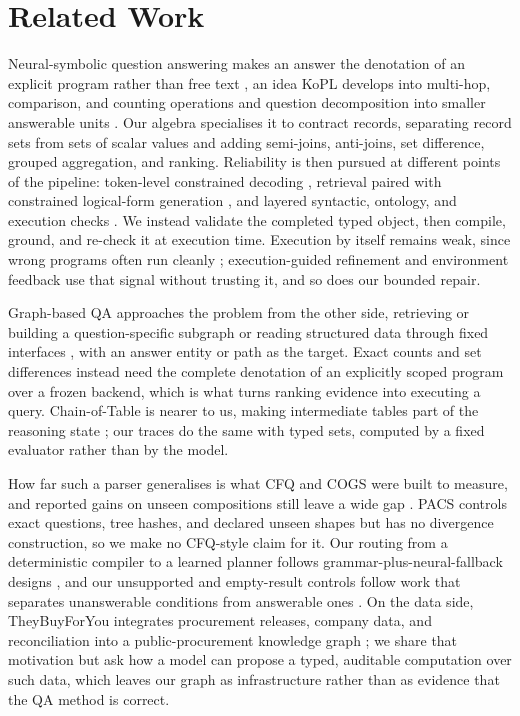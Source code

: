 \section{Related Work}
\label{sec:related}

Neural-symbolic question answering makes an answer the denotation of an explicit program rather
than free text \citep{liang-etal-2017-nsm}, an idea KoPL develops into multi-hop, comparison, and
counting operations \citep{cao-etal-2022-kqa} and question decomposition into smaller answerable
units \citep{wolfson-etal-2020-break}.  Our algebra specialises it to contract records,
separating record sets from sets of scalar values and adding semi-joins, anti-joins, set
difference, grouped aggregation, and ranking.  Reliability is then pursued at different points of
the pipeline: token-level constrained decoding \citep{scholak-etal-2021-picard}, retrieval paired
with constrained logical-form generation \citep{shu-etal-2022-tiara}, and layered syntactic,
ontology, and execution checks \citep{chen-etal-2021-retrack}.  We instead validate the completed
typed object, then compile, ground, and re-check it at execution time.  Execution by itself
remains weak, since wrong programs often run cleanly
\citep{wang-etal-2021-learning-executions}; execution-guided refinement
\citep{guo-etal-2023-parse} and environment feedback \citep{huang-etal-2024-queryagent} use that
signal without trusting it, and so does our bounded repair.

Graph-based QA approaches the problem from the other side, retrieving or building a
question-specific subgraph \citep{sun-etal-2018-open, sun-etal-2019-pullnet, jiang2023unikgqa,
luo2024rog} or reading structured data through fixed interfaces
\citep{jiang-etal-2023-structgpt}, with an answer entity or path as the target.  Exact counts and
set differences instead need the complete denotation of an explicitly scoped program over a
frozen backend, which is what turns ranking evidence into executing a query.  Chain-of-Table is
nearer to us, making intermediate tables part of the reasoning state
\citep{wang2024chainoftable}; our traces do the same with typed sets, computed by a fixed
evaluator rather than by the model.

How far such a parser generalises is what CFQ \citep{keysers2020cfq} and COGS
\citep{kim-linzen-2020-cogs} were built to measure, and reported gains on unseen compositions
still leave a wide gap \citep{oren-etal-2020-compositional}.  PACS controls exact questions, tree
hashes, and declared unseen shapes but has no divergence construction, so we make no CFQ-style
claim for it.  Our routing from a deterministic compiler to a learned planner follows
grammar-plus-neural-fallback designs \citep{shaw-etal-2021-compositional}, and our unsupported
and empty-result controls follow work that separates unanswerable conditions from answerable ones
\citep{patidar-etal-2023-grailqability}.  On the data side, TheyBuyForYou integrates procurement
releases, company data, and reconciliation into a public-procurement knowledge graph
\citep{distinto2022theybuyforyou}; we share that motivation but ask how a model can propose a
typed, auditable computation over such data, which leaves our graph as infrastructure rather than
as evidence that the QA method is correct.
